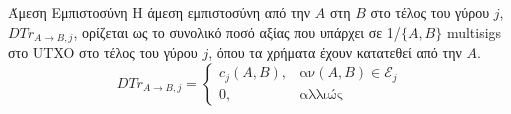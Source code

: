 {}
\begin{definitiongr}{Άμεση Εμπιστοσύνη}
  Η άμεση εμπιστοσύνη από την $A$ στη $B$ στο τέλος του γύρου $j$, $DTr_{A \rightarrow B, j}$, ορίζεται ως το συνολικό ποσό
  αξίας που υπάρχει σε 1/$\{A,B\}$ \textlatin{multisigs} στο \textlatin{UTXO} στο τέλος του γύρου $j$, όπου τα χρήματα έχουν
  κατατεθεί από την $A$.
  \begin{equation}
    DTr_{A \rightarrow B, j} =
      \begin{cases}
        c_j\left(A, B\right), & \mbox{αν} \left(A, B\right) \in \mathcal{E}_j \\
        0, & \mbox{αλλιώς}
      \end{cases}
  \end{equation}
\end{definitiongr}
